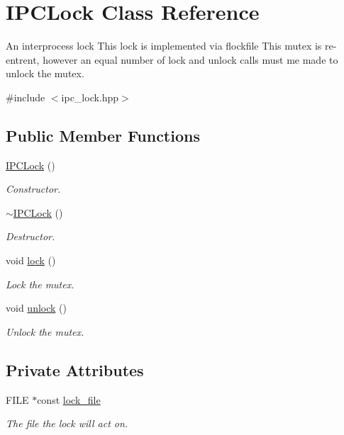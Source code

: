\hypertarget{class_i_p_c_lock}{}\section{I\+P\+C\+Lock Class Reference}
\label{class_i_p_c_lock}


An interprocess lock This lock is implemented via flockfile This mutex is re-\/entrent, however an equal number of lock and unlock calls must me made to unlock the mutex.  




{\ttfamily \#include $<$ipc\+\_\+lock.\+hpp$>$}

\subsection*{Public Member Functions}
\begin{DoxyCompactItemize}
\item 
\hyperlink{class_i_p_c_lock_ace857ec617e61e390e6ada59d2546f23}{I\+P\+C\+Lock} ()
\begin{DoxyCompactList}\small\item\em Constructor. \end{DoxyCompactList}\item 
\hyperlink{class_i_p_c_lock_ab0cb32d1b958cd4c9754666888caf358}{$\sim$\+I\+P\+C\+Lock} ()
\begin{DoxyCompactList}\small\item\em Destructor. \end{DoxyCompactList}\item 
void \hyperlink{class_i_p_c_lock_a9f6575d48f5754b13d9a1a59451ff2a3}{lock} ()
\begin{DoxyCompactList}\small\item\em Lock the mutex. \end{DoxyCompactList}\item 
void \hyperlink{class_i_p_c_lock_a28399a1d6ba139319c4addcaccb93a79}{unlock} ()
\begin{DoxyCompactList}\small\item\em Unlock the mutex. \end{DoxyCompactList}\end{DoxyCompactItemize}
\subsection*{Private Attributes}
\begin{DoxyCompactItemize}
\item 
F\+I\+LE $\ast$const \hyperlink{class_i_p_c_lock_a6b34119dda186eba6688250cd60cc347}{lock\+\_\+file}
\begin{DoxyCompactList}\small\item\em The file the lock will act on. \end{DoxyCompactList}\end{DoxyCompactItemize}


